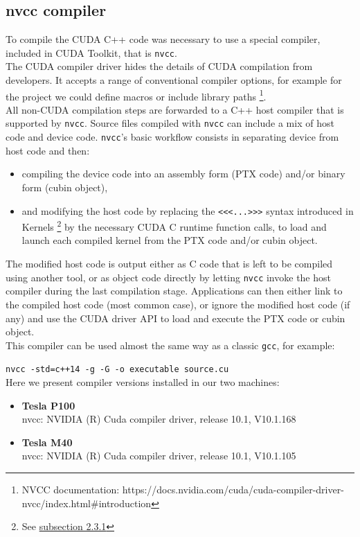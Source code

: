 	\subsection{nvcc compiler}
	To compile the CUDA C++ code was necessary to use a special compiler, included in CUDA Toolkit, that is \texttt{nvcc}.\\
	The CUDA compiler driver hides the details of CUDA compilation from developers. It accepts a range of conventional compiler options, for example for the project we could define macros or include library paths \footnote{NVCC documentation: https://docs.nvidia.com/cuda/cuda-compiler-driver-nvcc/index.html\#introduction}.\\ 
	All non-CUDA compilation steps are forwarded to a C++ host compiler that is supported by \texttt{nvcc}. 
	Source files compiled with \texttt{nvcc} can include a mix of host code and device code. \texttt{nvcc}'s basic
	workflow consists in separating device from host code and then:
	\begin{itemize}
		\item compiling the device code into an assembly form (PTX code) and/or binary form (cubin object), \item and modifying the host code by replacing the \texttt{<<<...>>>} syntax introduced in	Kernels \footnote{See  \hyperref[subs:ker]{subsection 2.3.1}} by the necessary CUDA C runtime function calls, to load and launch each compiled kernel from the PTX code and/or cubin object.
	\end{itemize}
	The modified host code is output either as C code that is left to be compiled using another tool, or as object code directly by letting \texttt{nvcc} invoke the host compiler during	the last compilation stage.
	Applications can then either link to the compiled host code (most common case), or ignore the modified host code (if any) and use the CUDA driver API to load and execute the PTX code or cubin object.\\
	This compiler can be used almost the same way as a classic \texttt{gcc}, for example:
	
	\texttt{nvcc -std=c++14 -g -G -o executable source.cu}\\	
	Here we present compiler versions installed in our two machines:	
	\begin{itemize}
		\item \textbf{Tesla P100}\\
		nvcc: NVIDIA (R) Cuda compiler driver, 
	 release 10.1, V10.1.168			
		 
		\item \textbf{Tesla M40}\\
	 nvcc: NVIDIA (R) Cuda compiler driver, 
	 release 10.1, V10.1.105
	\end{itemize}
		 
